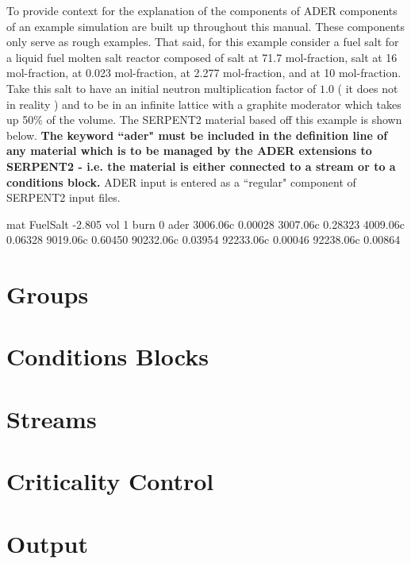 \documentclass{article}
\numberwithin{equation}{section}
\begin{document}
To provide context for the explanation of the components of ADER components of
an example simulation are built up throughout this manual. These components only
serve as rough examples.
That said, for this example consider a fuel salt for
a liquid fuel molten salt reactor composed of  salt at 71.7
mol-fraction,  salt at 16 mol-fraction,
 at 0.023 mol-fraction,  at 2.277 mol-fraction, 
and  at 10 mol-fraction. Take this salt to have
an initial neutron multiplication factor of $1.0$ ( it does not in reality )
and to be in an infinite lattice with a graphite moderator which takes up 50\%
of the volume. The SERPENT2 material based off this example is shown below.
\textbf{The keyword ``ader" must be included in the definition line of any 
material which is to be managed by the ADER extensions to SERPENT2 - i.e. the
material is either connected to a stream or to a conditions block.} ADER input
is entered as a ``regular" component of SERPENT2 input files.

\begin{li}
mat FuelSalt -2.805 vol 1 burn 0 ader
3006.06c    0.00028
3007.06c    0.28323
4009.06c    0.06328
9019.06c    0.60450
90232.06c   0.03954
92233.06c   0.00046
92238.06c   0.00864
\end{li}

\section{Groups}\label{sec:groups}


\section{Conditions Blocks}\label{sec:conditions_blocks}


\section{Streams}\label{sec:streams}


\section{Criticality Control}\label{sec:criticality_control}


\section{Output}\label{sec:output}

\end{document}
